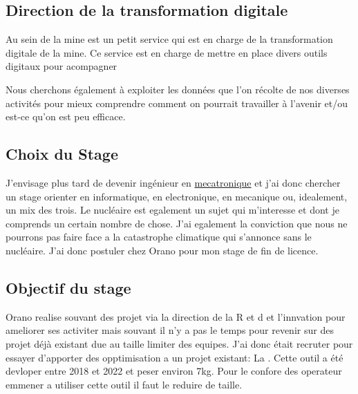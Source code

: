 \subsection{Direction de la transformation digitale}
Au sein de la mine est un petit service qui est en charge de la transformation digitale de la mine. Ce service est en charge de mettre en place divers outils digitaux pour acompagner %


Nous cherchons également à exploiter les données que l'on récolte de nos diverses activités pour mieux comprendre comment on pourrait travailler à l'avenir et/ou est-ce qu’on est peu efficace. %

\subsection{Choix du Stage}
J'envisage plus tard de devenir ingénieur en \href{https://fr.wikipedia.org/wiki/M%C3%A9catronique}{mecatronique} et j'ai donc chercher un stage orienter en informatique, en electronique, en mecanique ou, idealement, un mix des trois. Le nucléaire est egalement un sujet qui m'interesse et dont je comprends un certain nombre de chose. J'ai egalement la conviction que nous ne pourrons pas faire face a la catastrophe climatique qui s'annonce sans le nucléaire. J'ai donc postuler chez Orano pour mon stage de fin de licence. %
\subsection{Objectif du stage}

Orano realise souvant des projet via la direction de la R et d et l'innvation pour ameliorer ses activiter mais souvant il n'y a pas le temps pour revenir sur des projet déjà existant due au taille limiter des equipes. J'ai donc était recruter pour essayer d'apporter des opptimisation a un projet existant: La . Cette outil a été devloper entre 2018 et 2022 et peser environ 7kg. Pour le confore des operateur emmener a utiliser cette outil il faut le reduire de taille. %